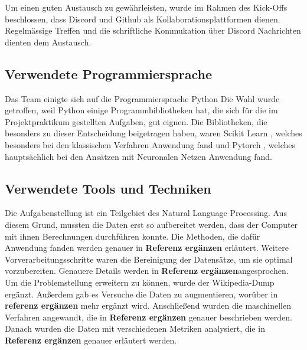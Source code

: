 Um einen guten Austausch zu gewährleisten, wurde im Rahmen des Kick-Offs beschlossen, dass Discord 
und Github 
als Kollaborationsplattformen dienen. Regelmässige Treffen und die schriftliche Kommukation über Discord Nachrichten dienten dem Austausch. %


\subsection{Verwendete Programmiersprache}
\label{Programmiersprache}
Das Team einigte sich auf die Programmiersprache Python
Die Wahl wurde getroffen, weil Python einige Programmbibliotheken hat, die sich für die im Projektpraktikum gestellten Aufgaben, gut eignen. Die Bibliotheken, die besonders zu dieser Entscheidung beigetragen haben, waren Scikit Learn \cite{skicitLearnRef}, welches besonders bei den klassischen Verfahren Anwendung fand und Pytorch \cite{pytorchRef}, welches hauptsächlich bei den Ansätzen mit Neuronalen Netzen Anwendung fand.

\subsection{Verwendete Tools und Techniken}
\label{ToolsUndTechniken}
Die Aufgabenstellung ist ein Teilgebiet des Natural Language Processing. Aus diesem Grund, mussten die Daten erst so aufbereitet werden, dass der Computer mit ihnen Berechnungen durchführen konnte. Die Methoden, die dafür Anwendung fanden werden genauer in \textbf{Referenz ergänzen} erläutert. Weitere Vorverarbeitungsschritte waren die Bereinigung der Datensätze, um sie optimal vorzubereiten. Genauere Details werden in \textbf{Referenz ergänzen}angesprochen. Um die Problemstellung erweitern zu können, wurde der Wikipedia-Dump ergänzt. Außerdem gab es Versuche die Daten zu augmentieren, worüber in \textbf{referenz ergänzen} mehr ergänzt wird. Anschließend wurden die maschinellen Verfahren angewandt, die in \textbf{Referenz ergänzen} genauer beschrieben werden. Danach wurden die Daten mit verschiedenen Metriken analysiert, die in \textbf{Referenz ergänzen} genauer erläutert werden.